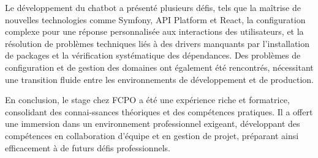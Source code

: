 Le développement du chatbot a présenté plusieurs défis, tels que la maîtrise de nouvelles technologies comme Symfony, API Platform et React, la configuration complexe pour une réponse personnalisée aux interactions des utilisateurs, et la résolution de problèmes techniques liés à des drivers manquants par l’installation de packages et la vérification systématique des dépendances. Des problèmes de configuration et de gestion des domaines ont également été rencontrés, nécessitant une transition fluide entre les environnements de développement et de production.

En conclusion, le stage chez FCPO a été une expérience riche et formatrice, consolidant des connai-ssances théoriques et des compétences pratiques. Il a offert une immersion dans un environnement professionnel exigeant, développant des compétences en collaboration d’équipe et en gestion de projet, préparant ainsi efficacement à de futurs défis professionnels.

%

\pagebreak
